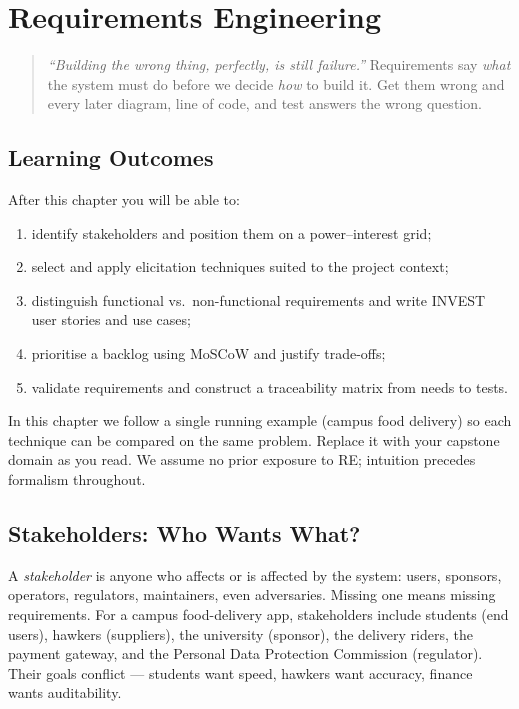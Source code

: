 \chapter{Requirements Engineering}\label{ch:requirements}

\begin{quote}
\emph{``Building the wrong thing, perfectly, is still failure.''} Requirements say \emph{what} the system must do before we decide \emph{how} to build it. Get them wrong and every later diagram, line of code, and test answers the wrong question.
\end{quote}

\noindent{}
\vspace{0.4em}

\section*{Learning Outcomes}
After this chapter you will be able to:
\begin{enumerate}[label=(L\arabic*)]
    \item identify stakeholders and position them on a power--interest grid;
    \item select and apply elicitation techniques suited to the project context;
    \item distinguish functional vs.\ non-functional requirements and write INVEST user stories and use cases;
    \item prioritise a backlog using MoSCoW and justify trade-offs;
    \item validate requirements and construct a traceability matrix from needs to tests.
\end{enumerate}
In this chapter we follow a single running example (campus food delivery) so each technique can be compared on the same problem. Replace it with your capstone domain as you read.
We assume no prior exposure to RE; intuition precedes formalism throughout.

\section{Stakeholders: Who Wants What?}
\label{sec:stakeholders}
A \emph{stakeholder} is anyone who affects or is affected by the system: users, sponsors, operators, regulators, maintainers, even adversaries. Missing one means missing requirements. For a campus food-delivery app, stakeholders include students (end users), hawkers (suppliers), the university (sponsor), the delivery riders, the payment gateway, and the Personal Data Protection Commission (regulator). Their goals conflict --- students want speed, hawkers want accuracy, finance wants auditability.

